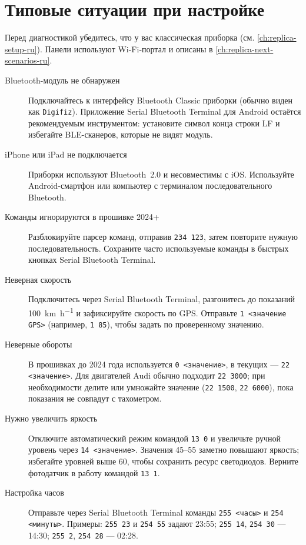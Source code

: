 \chapter{Типовые ситуации при настройке \ReplicaGenOne{}}\label{ch:replica-scenarios-ru}

Перед диагностикой убедитесь, что у вас классическая приборка \ReplicaGenOne{} (см. \autoref{ch:replica-setup-ru}).
Панели \ReplicaNextLong{} используют Wi-Fi-портал и описаны в \autoref{ch:replica-next-scenarios-ru}.

\begin{description}
    \item[Bluetooth-модуль не обнаружен] Подключайтесь к интерфейсу Bluetooth Classic приборки (обычно виден как \texttt{Digifiz}).
    Приложение Serial Bluetooth Terminal для Android остаётся рекомендуемым инструментом: установите символ конца строки LF и избегайте BLE-сканеров, которые не видят модуль.
    \item[iPhone или iPad не подключается] Приборки \ReplicaGenOneShort{} используют Bluetooth~2.0 и несовместимы с iOS. Используйте Android-смартфон или компьютер с терминалом последовательного Bluetooth.
    \item[Команды игнорируются в прошивке 2024+] Разблокируйте парсер команд, отправив \verb|234 123|, затем повторите нужную последовательность. Сохраните часто используемые команды в быстрых кнопках Serial Bluetooth Terminal.
    \item[Неверная скорость] Подключитесь через Serial Bluetooth Terminal, разгонитесь до показаний \SI{100}{\kilo\metre\per\hour} и зафиксируйте скорость по GPS. Отправьте \verb|1 <значение GPS>| (например, \verb|1 85|), чтобы задать  по проверенному значению.
    \item[Неверные обороты] В прошивках до 2024 года используется \verb|0 <значение>|, в текущих — \verb|22 <значение>|. Для двигателей Audi обычно подходит \verb|22 3000|; при необходимости делите или умножайте значение (\verb|22 1500|, \verb|22 6000|), пока показания не совпадут с тахометром.
    \item[Нужно увеличить яркость] Отключите автоматический режим командой \verb|13 0| и увеличьте ручной уровень через \verb|14 <значение>|. Значения 45--55 заметно повышают яркость; избегайте уровней выше 60, чтобы сохранить ресурс светодиодов. Верните фотодатчик в работу командой \verb|13 1|.
    \item[Настройка часов] Отправьте через Serial Bluetooth Terminal команды \verb|255 <часы>| и \verb|254 <минуты>|. Примеры: \verb|255 23| и \verb|254 55| задают 23:55; \verb|255 14|, \verb|254 30| — 14:30; \verb|255 2|, \verb|254 28| — 02:28.

\end{description}
